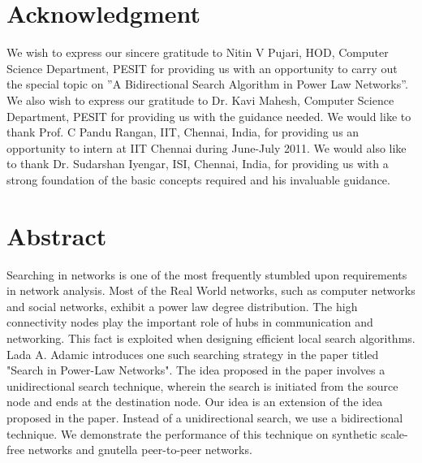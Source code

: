 \documentclass[a4paper,12pt]{article}
\begin{document}
\renewcommand*\rmdefault{ppl}\normalfont\upshape
\renewcommand{\headrulewidth}{0.5pt}
\renewcommand{\footrulewidth}{0.5pt}






\newpage
\section*{\Huge{Acknowledgment}}
We wish to express our sincere gratitude to Nitin V Pujari, HOD, Computer Science Department, PESIT for providing us with an opportunity to carry out the special topic on ''A Bidirectional Search Algorithm in Power Law Networks''. We also wish to express our gratitude to Dr. Kavi Mahesh, Computer Science Department, PESIT for providing us with the guidance needed. We would like to thank Prof. C Pandu Rangan, IIT, Chennai, India, for providing us an opportunity to intern at IIT Chennai during June-July 2011. We would also like to thank Dr. Sudarshan Iyengar, ISI, Chennai, India, for providing us with a strong foundation of the basic concepts required and his invaluable guidance.

\newpage
\section*{\Huge{Abstract}}
Searching in networks is one of the most frequently stumbled upon requirements in network analysis. Most of the Real World networks, such as computer networks and social networks, exhibit a power law degree distribution. The high connectivity nodes play the important role of hubs in communication and networking. This fact is exploited when designing efficient local search algorithms. Lada A. Adamic introduces one such searching strategy in the paper titled "Search in Power-Law Networks". The idea proposed in the paper involves a unidirectional search technique, wherein the search is initiated from the source node and ends at the destination node. Our idea is an extension of the idea proposed in the paper. Instead of a unidirectional search, we use a bidirectional technique. We demonstrate the performance of this technique on synthetic scale-free networks and gnutella peer-to-peer networks.
\newpage

\newpage
\tableofcontents



\cfoot{\thepage}
\end{document}
